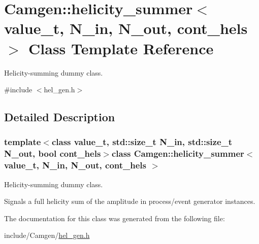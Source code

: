 \hypertarget{a00275}{\section{Camgen\-:\-:helicity\-\_\-summer$<$ value\-\_\-t, N\-\_\-in, N\-\_\-out, cont\-\_\-hels $>$ Class Template Reference}
\label{a00275}
}


Helicity-\/summing dummy class.  




{\ttfamily \#include $<$hel\-\_\-gen.\-h$>$}



\subsection{Detailed Description}
\subsubsection*{template$<$class value\-\_\-t, std\-::size\-\_\-t N\-\_\-in, std\-::size\-\_\-t N\-\_\-out, bool cont\-\_\-hels$>$class Camgen\-::helicity\-\_\-summer$<$ value\-\_\-t, N\-\_\-in, N\-\_\-out, cont\-\_\-hels $>$}

Helicity-\/summing dummy class. 

Signals a full helicity sum of the amplitude in process/event generator instances. 

The documentation for this class was generated from the following file\-:\begin{DoxyCompactItemize}
\item 
include/\-Camgen/\hyperlink{a00639}{hel\-\_\-gen.\-h}\end{DoxyCompactItemize}
